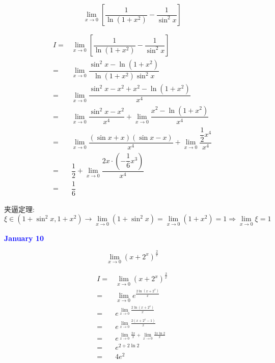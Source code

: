 \begin{example}[][Exam: 27.2.4]
	$$\lim\limits_{x\to 0}\left[\dfrac{1}{\ln(1+x^{2})}-\dfrac{1}{\sin^{2}x}\right]$$
\end{example}

\begin{solution}

	\begin{align*}
		I = & \lim\limits_{x\to 0}\left[\dfrac{1}{\ln(1+x^{2})}-\dfrac{1}{\sin^{2}x}\right]\\
		  = & \lim\limits_{x\to 0}\dfrac{\sin^{2}x-\ln(1+x^{2})}{\ln(1+x^{2})\sin^{2}x}\\
		  = & \lim\limits_{x\to 0}\dfrac{\sin^{2}x-x^{2}+x^{2}-\ln(1+x^{2})}{x^{4}}\\
		  = & \lim\limits_{x\to 0}\dfrac{\sin^{2}x-x^{2}}{x^{4}}+\lim\limits_{x\to 0}\dfrac{x^{2}-\ln(1+x^{2})}{x^{4}}\\
		  = & \lim\limits_{x\to 0}\dfrac{(\sin x+x)(\sin x-x)}{x^{4}}+\lim\limits_{x\to 0}\dfrac{\dfrac{1}{2}x^{4}}{x^{4}}\\
		  = & \dfrac{1}{2}+\lim\limits_{x\to 0}\dfrac{2x\cdot(-\dfrac{1}{6}x^{3})}{x^{4}}\\ 
		  = & \dfrac{1}{6}
	\end{align*}
	
	夹逼定理: 
	$$\xi\in(1+\sin^{2}x,1+x^{2})\to \lim\limits_{x\to 0}(1+\sin^{2}x) = \lim\limits_{x\to 0} (1+x^{2}) = 1\Rightarrow \lim\limits_{x\to 0}\xi = 1$$
\end{solution}

\textcolor{blue}{\textbf{January 10}}

\begin{example}[][Exam: 27.2.5]
	$$\lim\limits_{x\to 0}\left(x+2^{x}\right)^{\frac{2}{x}}$$
\end{example}

\begin{solution}
	
	\begin{align*}
		I = & \lim\limits_{x\to 0}(x+2^{x})^{\frac{2}{x}}\\
		  = & \lim\limits_{x\to 0}e^{\frac{2\ln(x+2^{x})}{x}}\\
		  = & e^{\lim\limits_{x\to 0}\frac{2\ln(x+2^{x})}{x}}\\
		  = & e^{\lim\limits_{x\to 0}\frac{2(x+2^{x}-1)}{x}}\\
		  = & e^{\lim\limits_{x\to 0}\frac{2x}{x}+\lim\limits_{x\to 0}\frac{2x\ln 2}{x}}\\
		  = & e^{2+2\ln 2}\\
		  = & 4e^{2}
	\end{align*}
\end{solution}

